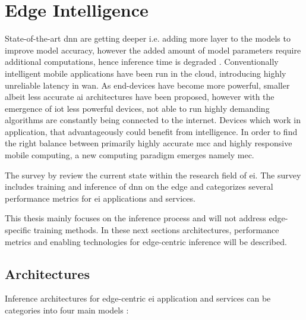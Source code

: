 \section{Edge Intelligence}

State-of-the-art \gls{dnn} are getting deeper i.e. adding more layer to the models to improve model accuracy, however the added amount of model parameters require additional computations, hence inference time is degraded \cite{bibid}. Conventionally intelligent mobile applications have been run in the cloud, introducing highly unreliable latency in \gls{wan}. As end-devices have become more powerful, smaller albeit less accurate \gls{ai} architectures have been proposed, however with the emergence of \gls{iot} less powerful devices, not able to run highly demanding algorithms are constantly being connected to the internet. Devices which work in application, that advantageously could benefit from intelligence. In order to find the right balance between primarily highly accurate \gls{mcc} and highly responsive mobile computing, a new computing paradigm emerges namely \gls{mec}.  

The survey  by \citet{zhou_edge_2019} review the current state within the research field of \gls{ei}. The survey includes training and inference of \gls{dnn} on the edge and categorizes several performance metrics for \gls{ei} applications and services. 

This thesis mainly focuses on the inference process and will not address edge-specific training methods. In these next sections architectures, performance metrics and enabling technologies for edge-centric inference will be described.  

\subsection{Architectures}

Inference architectures for edge-centric \gls{ei} application and services can be categories into four main models \cite{zhou_edge_2019}:

